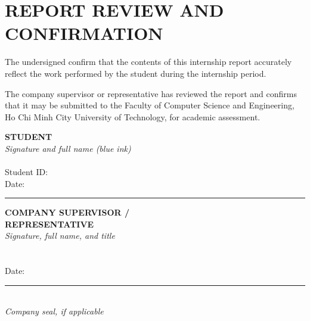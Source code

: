 \clearpage
\thispagestyle{plain}
\chapter*{REPORT REVIEW AND CONFIRMATION}

The undersigned confirm that the contents of this internship report accurately
reflect the work performed by the student during the internship period.

The company supervisor or representative has reviewed the report and confirms
that it may be submitted to the Faculty of Computer Science and Engineering,
Ho Chi Minh City University of Technology, for academic assessment.

\vspace{1.5cm}
\noindent
\begin{minipage}[t]{0.46\textwidth}
  \centering
  \textbf{STUDENT}\\[0.45cm]
  \textit{Signature and full name (blue ink)}\\[2.3cm]
  \textbf{\StudentName}\\[0.45cm]
  Student ID: \StudentID\\[0.8cm]
  Date: \rule{4.2cm}{0.4pt}
\end{minipage}\hfill
\begin{minipage}[t]{0.46\textwidth}
  \centering
  \textbf{COMPANY SUPERVISOR /}\\
  \textbf{REPRESENTATIVE}\\[0.45cm]
  \textit{Signature, full name, and title}\\[2.3cm]
  \textbf{\CompanySupervisorName}\\[0.45cm]
  \CompanySupervisorTitle\\[0.8cm]
  Date: \rule{4.2cm}{0.4pt}\\[0.9cm]
  \textit{Company seal, if applicable}
\end{minipage}